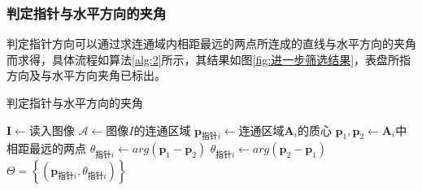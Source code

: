 \documentclass[a4paper]{ctexart}
\begin{document}
\subsubsection{判定指针与水平方向的夹角}\label{sec:1}
判定指针方向可以通过求连通域内相距最远的两点所连成的直线与水平方向的夹角而求得，具体流程如算法\ref{alg:2}所示，其结果如图\ref{fig:进一步筛选结果}，表盘所指方向及与水平方向夹角已标出。
\begin{algorithm}
	\caption{判定指针与水平方向的夹角}
	\label{alg:2}
	\begin{algorithmic}[1]
		\Require $\bm I\gets$读入图像
		\State $\mathcal A\gets$图像$I$的连通区域
		\State $\bm p_{\text{指针}i}\gets$连通区域$\bm A_i$的质心
		\State $\bm p_1,\bm p_2\gets\bm A_i$中相距最远的两点
		\State $\theta_{\text{指针}i}\gets arg(\bm p_1-\bm p_2)$
		\Else
		\State $\theta_{\text{指针}i}\gets arg(\bm p_2-\bm p_1)$
		\EndIf
		\EndFor
		\Ensure $\Theta=\left\{(\bm p_{\text{指针}i},\theta_{\text{指针}i})\right\}$
	\end{algorithmic}
\end{algorithm}
\end{document}
